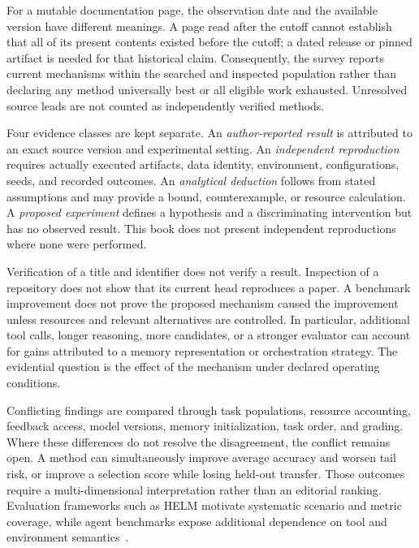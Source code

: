 For a mutable documentation page, the observation date and the available version have different meanings. A page read after the cutoff cannot establish that all of its present contents existed before the cutoff; a dated release or pinned artifact is needed for that historical claim. Consequently, the survey reports current mechanisms within the searched and inspected population rather than declaring any method universally best or all eligible work exhausted. Unresolved source leads are not counted as independently verified methods.

Four evidence classes are kept separate. An \emph{author-reported result} is attributed to an exact source version and experimental setting. An \emph{independent reproduction} requires actually executed artifacts, data identity, environment, configurations, seeds, and recorded outcomes. An \emph{analytical deduction} follows from stated assumptions and may provide a bound, counterexample, or resource calculation. A \emph{proposed experiment} defines a hypothesis and a discriminating intervention but has no observed result. This book does not present independent reproductions where none were performed.

Verification of a title and identifier does not verify a result. Inspection of a repository does not show that its current head reproduces a paper. A benchmark improvement does not prove the proposed mechanism caused the improvement unless resources and relevant alternatives are controlled. In particular, additional tool calls, longer reasoning, more candidates, or a stronger evaluator can account for gains attributed to a memory representation or orchestration strategy. The evidential question is the effect of the mechanism under declared operating conditions.

Conflicting findings are compared through task populations, resource accounting, feedback access, model versions, memory initialization, task order, and grading. Where these differences do not resolve the disagreement, the conflict remains open. A method can simultaneously improve average accuracy and worsen tail risk, or improve a selection score while losing held-out transfer. Those outcomes require a multi-dimensional interpretation rather than an editorial ranking. Evaluation frameworks such as HELM motivate systematic scenario and metric coverage, while agent benchmarks expose additional dependence on tool and environment semantics~\cite{liang2022helm,liu2023agentbench,yao2024taubench}.

